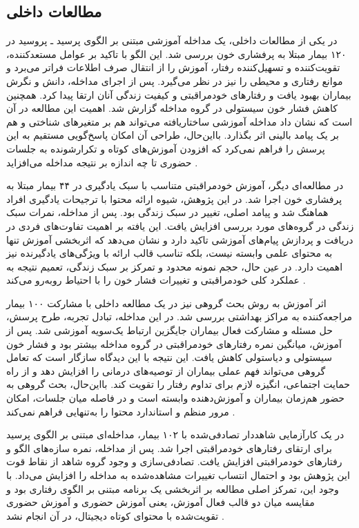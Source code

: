 \subsection{مطالعات داخلی}
در یکی از مطالعات داخلی، یک مداخله آموزشی مبتنی بر الگوی پرسید ـ پروسید در ۱۲۰ بیمار مبتلا به پرفشاری خون بررسی شد. این الگو با تاکید بر عوامل مستعدکننده، تقویت‌کننده و تسهیل‌کننده رفتار، آموزش را از انتقال صرف اطلاعات فراتر می‌برد و موانع رفتاری و محیطی را نیز در نظر می‌گیرد. پس از اجرای مداخله، دانش و نگرش بیماران بهبود یافت و رفتارهای خودمراقبتی و کیفیت زندگی آنان ارتقا پیدا کرد. همچنین کاهش فشار خون سیستولی در گروه مداخله گزارش شد. اهمیت این مطالعه در آن است که نشان داد مداخله آموزشی ساختاریافته می‌تواند هم بر متغیرهای شناختی و هم بر یک پیامد بالینی اثر بگذارد. بااین‌حال، طراحی آن امکان پاسخ‌گویی مستقیم به این پرسش را فراهم نمی‌کرد که افزودن آموزش‌های کوتاه و تکرارشونده به جلسات حضوری تا چه اندازه بر نتیجه مداخله می‌افزاید \cite{rakhshani2024precede}.
\par
در مطالعه‌ای دیگر، آموزش خودمراقبتی متناسب با سبک یادگیری در ۴۴ بیمار مبتلا به پرفشاری خون اجرا شد. در این پژوهش، شیوه ارائه محتوا با ترجیحات یادگیری افراد هماهنگ شد و پیامد اصلی، تغییر در سبک زندگی بود. پس از مداخله، نمرات سبک زندگی در گروه‌های مورد بررسی افزایش یافت. این یافته بر اهمیت تفاوت‌های فردی در دریافت و پردازش پیام‌های آموزشی تاکید دارد و نشان می‌دهد که اثربخشی آموزش تنها به محتوای علمی وابسته نیست، بلکه تناسب قالب ارائه با ویژگی‌های یادگیرنده نیز اهمیت دارد. در عین حال، حجم نمونه محدود و تمرکز بر سبک زندگی، تعمیم نتیجه به عملکرد کلی خودمراقبتی و تغییرات فشار خون را با احتیاط روبه‌رو می‌کند \cite{ghorbani2021vark}.
\par
اثر آموزش به روش بحث گروهی نیز در یک مطالعه داخلی با مشارکت ۱۰۰ بیمار مراجعه‌کننده به مراکز بهداشتی بررسی شد. در این مداخله، تبادل تجربه، طرح پرسش، حل مسئله و مشارکت فعال بیماران جایگزین ارتباط یک‌سویه آموزشی شد. پس از آموزش، میانگین نمره رفتارهای خودمراقبتی در گروه مداخله بیشتر بود و فشار خون سیستولی و دیاستولی کاهش یافت. این نتیجه با این دیدگاه سازگار است که تعامل گروهی می‌تواند فهم عملی بیماران از توصیه‌های درمانی را افزایش دهد و از راه حمایت اجتماعی، انگیزه لازم برای تداوم رفتار را تقویت کند. بااین‌حال، بحث گروهی به حضور هم‌زمان بیماران و آموزش‌دهنده وابسته است و در فاصله میان جلسات، امکان مرور منظم و استاندارد محتوا را به‌تنهایی فراهم نمی‌کند \cite{nasirian2019group}.
\par
در یک کارآزمایی شاهددار تصادفی‌شده با ۱۰۲ بیمار، مداخله‌ای مبتنی بر الگوی پرسید برای ارتقای رفتارهای خودمراقبتی اجرا شد. پس از مداخله، نمره سازه‌های الگو و رفتارهای خودمراقبتی افزایش یافت. تصادفی‌سازی و وجود گروه شاهد از نقاط قوت این پژوهش بود و احتمال انتساب تغییرات مشاهده‌شده به مداخله را افزایش می‌داد. با وجود این، تمرکز اصلی مطالعه بر اثربخشی یک برنامه مبتنی بر الگوی رفتاری بود و مقایسه میان دو قالب فعال آموزش، یعنی آموزش حضوری و آموزش حضوری تقویت‌شده با محتوای کوتاه دیجیتال، در آن انجام نشد \cite{abedi2020precede}.
